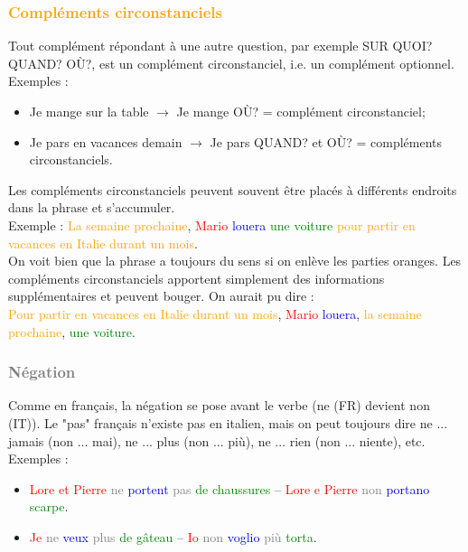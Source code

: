 \documentclass[12pt, openany]{report}
\begin{document}
\subsubsection{\textcolor{orange}{Compléments circonstanciels}}
Tout complément répondant à une autre question, par exemple SUR QUOI? QUAND? OÙ?, est un complément circonstanciel, i.e. un complément optionnel. \\
Exemples : 
\begin{itemize}
    \item Je mange sur la table $\rightarrow$ Je mange OÙ? = complément circonstanciel;
    \item Je pars en vacances demain $\rightarrow$ Je pars QUAND? et OÙ? = compléments circonstanciels.
\end{itemize}
Les compléments circonstanciels peuvent souvent être placés à différents endroits dans la phrase et s'accumuler. \\ Exemple : \textcolor{orange}{La semaine prochaine}, \textcolor{red}{Mario} \textcolor{blue}{louera} \textcolor{green}{une voiture} \textcolor{orange}{pour partir en vacances en Italie durant un mois}.\\
On voit bien que la phrase a toujours du sens si on enlève les parties oranges. Les compléments circonstanciels apportent simplement des informations supplémentaires et peuvent bouger. On aurait pu dire :\\
\textcolor{orange}{Pour partir en vacances en Italie durant un mois}, \textcolor{red}{Mario} \textcolor{blue}{louera}, \textcolor{orange}{la semaine prochaine}, \textcolor{green}{une voiture}.
\subsubsection{\textcolor{gray}{Négation}}
Comme en français, la négation se pose avant le verbe (ne (FR) devient non (IT)). Le "pas" français n'existe pas en italien, mais on peut toujours dire ne ... jamais (non ... mai), ne ... plus (non ... più), ne ... rien (non ... niente), etc.\\
Exemples :
\begin{itemize}
    \item \textcolor{red}{Lore et Pierre} \textcolor{gray}{ne} \textcolor{blue}{portent} \textcolor{gray}{pas} \textcolor{green}{de chaussures} -- \textcolor{red}{Lore e Pierre} \textcolor{gray}{non} \textcolor{blue}{portano} \textcolor{green}{scarpe}.
    \item \textcolor{red}{Je} \textcolor{gray}{ne} \textcolor{blue}{veux} \textcolor{gray}{plus} \textcolor{green}{de gâteau} -- \textcolor{red}{Io} \textcolor{gray}{non} \textcolor{blue}{voglio} \textcolor{gray}{più} \textcolor{green}{torta}.   
\end{itemize}
\end{document}
